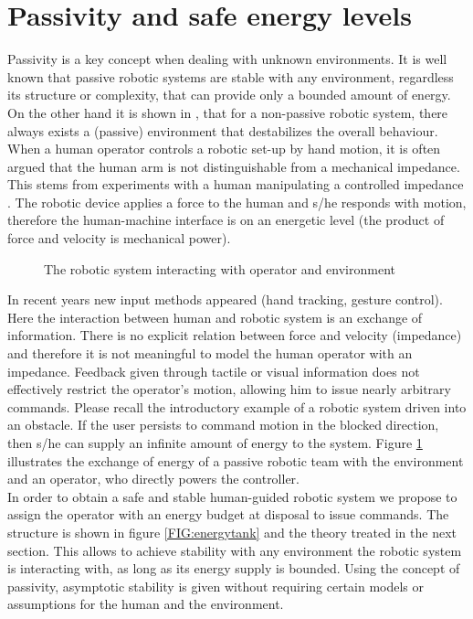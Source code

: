 \documentclass[a4paper,twoside, openright,12pt]{report}
\begin{document}
\section{Passivity and safe energy levels}\label{S:PassivitySafety}
Passivity is a key concept when dealing with unknown environments. It is well known that passive robotic systems are stable with any environment, regardless its structure or complexity, that can provide only a bounded amount of energy. On the other hand it is shown in \cite{Stramigioli_15}, that for a non-passive robotic system, there always exists a (passive) environment that destabilizes the overall behaviour.\\
When a human operator controls a robotic set-up by hand motion, it is often argued that the human arm is not distinguishable from a mechanical impedance. This stems from experiments with a human manipulating a controlled impedance \cite{Hogan_89}. The robotic device applies a force to the human and s/he responds with motion, therefore the human-machine interface is on an energetic level (the product of force and velocity is mechanical power).
\begin{figure}[b!]
	\centering
	\small
	\def\svgwidth{0.95\columnwidth}
	
	\vspace{10pt}
	\caption{The robotic system interacting with operator and environment}
	\label{FIG:passivityenvironment}
\end{figure}
In recent years new input methods appeared (hand tracking, gesture control). Here the interaction between human and robotic system is an exchange of information. There is no explicit relation between force and velocity (impedance) and therefore it is not meaningful to model the human operator with an impedance. Feedback given through tactile or visual information does not effectively restrict the operator's motion, allowing him to issue nearly arbitrary commands. Please recall the introductory example of a robotic system driven into an obstacle. If the user persists to command motion in the blocked direction, then s/he can supply an infinite amount of energy to the system. Figure \ref{FIG:passivityenvironment} illustrates the exchange of energy of a passive robotic team with the environment and an operator, who directly powers the controller.\\
In order to obtain a safe and stable human-guided robotic system we propose to assign the operator with an energy budget at disposal to issue commands. The structure is shown in figure \ref{FIG:energytank} and the theory treated in the next section. This allows to achieve stability with any environment the robotic system is interacting with, as long as its energy supply is bounded. Using the concept of passivity, asymptotic stability is given without requiring certain models or assumptions for the human and the environment.\\
\end{document}
